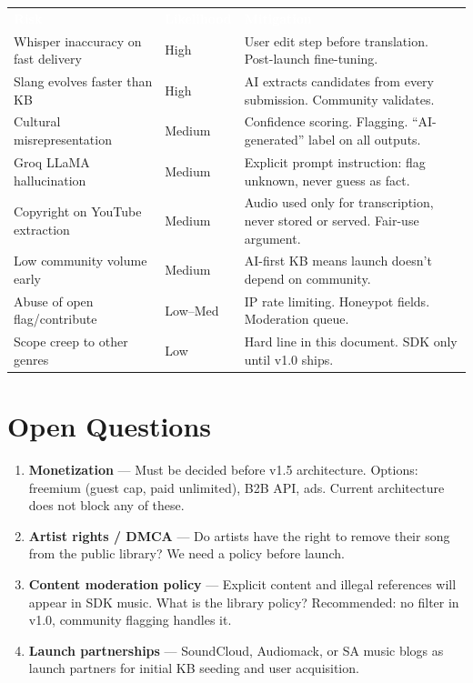 \documentclass[12pt, a4paper]{article}
\begin{document}
\renewcommand{\arraystretch}{1.5}
\begin{center}
\begin{tabular}{L{4cm} L{2.5cm} L{7cm}}
  \textcolor{white}{\textbf{Risk}} &
  \textcolor{white}{\textbf{Likelihood}} &
  \textcolor{white}{\textbf{Mitigation}} \\
  Whisper inaccuracy on fast delivery & High &
  User edit step before translation. Post-launch fine-tuning. \\
  Slang evolves faster than KB & High &
  AI extracts candidates from every submission. Community validates. \\
  Cultural misrepresentation & Medium &
  Confidence scoring. Flagging. ``AI-generated'' label on all outputs. \\
  Groq LLaMA hallucination & Medium &
  Explicit prompt instruction: flag unknown, never guess as fact. \\
  Copyright on YouTube extraction & Medium &
  Audio used only for transcription, never stored or served. Fair-use argument. \\
  Low community volume early & Medium &
  AI-first KB means launch doesn't depend on community. \\
  Abuse of open flag/contribute & Low--Med &
  IP rate limiting. Honeypot fields. Moderation queue. \\
  Scope creep to other genres & Low &
  Hard line in this document. SDK only until v1.0 ships. \\
\end{tabular}
\end{center}

\section{Open Questions}

\begin{enumerate}
  \item \textbf{Monetization} — Must be decided before v1.5 architecture.
        Options: freemium (guest cap, paid unlimited), B2B API, ads.
        Current architecture does not block any of these.
  \item \textbf{Artist rights / DMCA} — Do artists have the right to remove
        their song from the public library? We need a policy before launch.
  \item \textbf{Content moderation policy} — Explicit content and illegal
        references will appear in SDK music. What is the library policy?
        Recommended: no filter in v1.0, community flagging handles it.
  \item \textbf{Launch partnerships} — SoundCloud, Audiomack, or SA music
        blogs as launch partners for initial KB seeding and user acquisition.
\end{enumerate}
\end{document}
